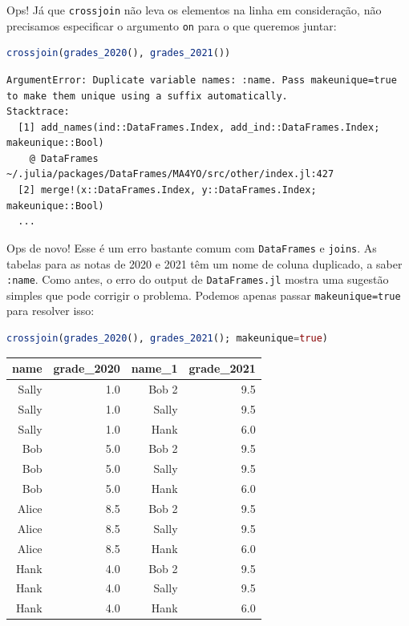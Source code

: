 \documentclass[
  notoc %
]{tufte-book}
\newcommand{\passthrough}[1]{#1}
\begin{document}
Ops! Já que \passthrough{\lstinline!crossjoin!} não leva os elementos na
linha em consideração, não precisamos especificar o argumento
\passthrough{\lstinline!on!} para o que queremos juntar:

\begin{lstlisting}[language=Julia]
crossjoin(grades_2020(), grades_2021())
\end{lstlisting}

\begin{lstlisting}[language=Output]
ArgumentError: Duplicate variable names: :name. Pass makeunique=true to make them unique using a suffix automatically.
Stacktrace:
  [1] add_names(ind::DataFrames.Index, add_ind::DataFrames.Index; makeunique::Bool)
    @ DataFrames ~/.julia/packages/DataFrames/MA4YO/src/other/index.jl:427
  [2] merge!(x::DataFrames.Index, y::DataFrames.Index; makeunique::Bool)
  ...
\end{lstlisting}

Ops de novo! Esse é um erro bastante comum com
\passthrough{\lstinline!DataFrames!} e \passthrough{\lstinline!joins!}.
As tabelas para as notas de 2020 e 2021 têm um nome de coluna duplicado,
a saber \passthrough{\lstinline!:name!}. Como antes, o erro do output de
\passthrough{\lstinline!DataFrames.jl!} mostra uma sugestão simples que
pode corrigir o problema. Podemos apenas passar
\passthrough{\lstinline!makeunique=true!} para resolver isso:

\begin{lstlisting}[language=Julia]
crossjoin(grades_2020(), grades_2021(); makeunique=true)
\end{lstlisting}

\begin{longtable}[]{@{}rrrr@{}}
\toprule
name & grade\_2020 & name\_1 & grade\_2021 \\
\midrule
\endhead
Sally & 1.0 & Bob 2 & 9.5 \\
Sally & 1.0 & Sally & 9.5 \\
Sally & 1.0 & Hank & 6.0 \\
Bob & 5.0 & Bob 2 & 9.5 \\
Bob & 5.0 & Sally & 9.5 \\
Bob & 5.0 & Hank & 6.0 \\
Alice & 8.5 & Bob 2 & 9.5 \\
Alice & 8.5 & Sally & 9.5 \\
Alice & 8.5 & Hank & 6.0 \\
Hank & 4.0 & Bob 2 & 9.5 \\
Hank & 4.0 & Sally & 9.5 \\
Hank & 4.0 & Hank & 6.0 \\
\bottomrule
\end{longtable}
\end{document}
